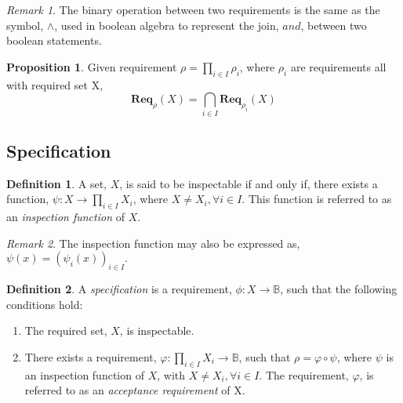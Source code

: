 \documentclass{article}
\theoremstyle{definition}
\newtheorem{definition}{Definition}[part]
\theoremstyle{remark}
\newtheorem*{remark}{Remark}
\theoremstyle{definition}
\newtheorem{proposition}{Proposition}[section]
\newcommand{\func}[3]{#1:#2\rightarrow#3}
\newcommand{\reqfunc}[2]{#1:#2\rightarrow\mathbb{B}}
\newcommand{\reqop}[2]{\mathbf{Req}_{#1}(#2)}
\begin{document}
            \begin{remark}
                The binary operation between two requirements is the same as the symbol, $\wedge$, used in boolean
                algebra to represent the join, $and$, between two boolean statements.
            \end{remark}

            \begin{proposition}
                Given requirement $\rho = \prod_{i \in I}{\rho_{i}}$, where $\rho_{i}$ are requirements all with
                required set X,
                \[
                \reqop{\rho}{X} = \bigcap_{i \in I}{\reqop{\rho_{i}}{X}}
                \]
            \end{proposition}

            \subsection{Specification}

                \begin{definition}
                    A set, $X$, is said to be inspectable if and only if, there exists a function,
                    $\func{\psi}{X}{\prod_{i \in I}{X_{i}}}$, where $X \ne X_{i}, \forall i \in I$.
                    This function is referred to as an \emph{inspection function} of $X$.
                \end{definition}

                \begin{remark}
                    The inspection function may also be expressed as, $\psi(x) = (\psi_{i}(x))_{i \in I}.$
                \end{remark}

                \begin{definition}
                    A \emph{specification} is a requirement, $\reqfunc{\phi}{X}$, such that the following conditions
                    hold:

                    \begin{enumerate}
                        \item   The required set, $X$, is inspectable.

                        \item   There exists a requirement, $\reqfunc{\varphi}{\prod_{i \in I}{X_{i}}}$,
                                such that $\rho = \varphi \circ \psi$, where $\psi$ is an inspection function of $X$,
                                with $X \ne X_{i}, \forall i \in I$. The requirement, $\varphi$, is referred to as an
                                \emph{acceptance requirement} of X.
                    \end{enumerate}

                \end{definition}
\end{document}

